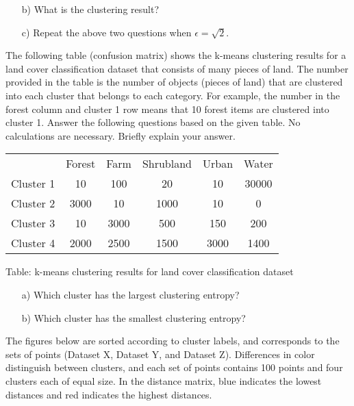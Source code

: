 \documentclass[11pt]{article}
\begin{document}
\begin{itemize}
\begin{enumerate}
	\item[b)] What is the clustering result?
	\item[c)] Repeat the above two questions when $\epsilon = \sqrt{2}$.
\end{enumerate}
The following table (confusion matrix) shows the k-means clustering results for a land cover classification dataset that consists of many pieces of land. The number provided in the table is the number of objects (pieces of land) that are clustered into each cluster that belongs to each category. For example, the number in the forest column and cluster 1 row means that 10 forest items are clustered into cluster 1. Answer the following questions based on the given table. No calculations are necessary. Briefly explain your answer. 

\begin{center}
\begin{tabular}{|c|c|c|c|c|c|} \hline
            &	Forest	&Farm &	Shrubland &	Urban &	Water \\
  Cluster 1 &	10 &	100	 &20	 &10	& 30000 \\
  Cluster 2	& 3000	& 10	& 1000	& 10	& 0 \\
  Cluster 3	& 10	& 3000	& 500	& 150	& 200 \\
  Cluster 4	 &2000	& 2500 &	1500	& 3000	& 1400  \\ \hline
\end{tabular} 
  \begin{center}
Table: k-means clustering results for land cover classification dataset
  \end{center}
\end{center}
\begin{enumerate}
\item[a)]	Which cluster has the largest clustering entropy?  
\item[b)]	Which cluster has the smallest clustering entropy?  
\end{enumerate}
\newpage
{}
The figures below are sorted according to cluster labels, and corresponds to the sets of points (Dataset X, Dataset Y, and Dataset Z). Differences in color distinguish between clusters, and each set of points contains 100 points and four clusters each of equal size. In the distance matrix, blue indicates the lowest distances and red indicates the highest distances.


\end{itemize}
\end{document}
